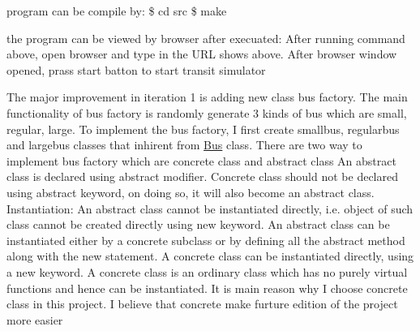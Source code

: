 program can be compile by\+: \$ cd src \$ make

the program can be viewed by browser after execuated\+: After running command above, open browser and type in the U\+RL shows above. After browser window opened, prass start batton to start transit simulator

The major improvement in iteration 1 is adding new class bus factory. The main functionality of bus factory is randomly generate 3 kinds of bus which are small, regular, large. To implement the bus factory, I first create smallbus, regularbus and largebus classes that inhirent from \hyperlink{classBus}{Bus} class. There are two way to implement bus factory which are concrete class and abstract class An abstract class is declared using abstract modifier. Concrete class should not be declared using abstract keyword, on doing so, it will also become an abstract class. Instantiation\+: An abstract class cannot be instantiated directly, i.\+e. object of such class cannot be created directly using new keyword. An abstract class can be instantiated either by a concrete subclass or by defining all the abstract method along with the new statement. A concrete class can be instantiated directly, using a new keyword. A concrete class is an ordinary class which has no purely virtual functions and hence can be instantiated. It is main reason why I choose concrete class in this project. I believe that concrete make furture edition of the project more easier 
